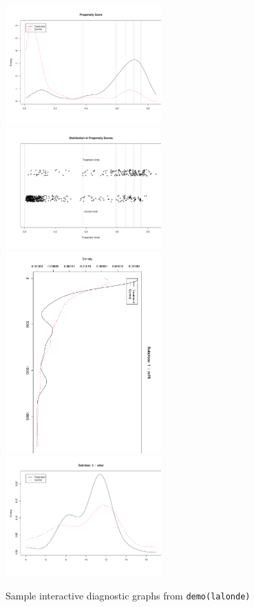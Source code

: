 \documentclass[oneside,letterpaper,titlepage]{article}
\begin{document}
\begin{figure}[tbp]
  \begin{center}
    \includegraphics[width=2.35in,angle=0]{figs/subclass1}
    \includegraphics[width=2.35in,angle=0]{figs/subclass2}
    \includegraphics[width=2.35in,angle=0]{figs/subclass3}
    \includegraphics[width=2.35in,angle=0]{figs/subclass4}
    \hfill
    \caption{Sample interactive diagnostic graphs from \texttt{demo(lalonde)}}
\label{diags}
\end{center}
\end{figure}
\end{document}
